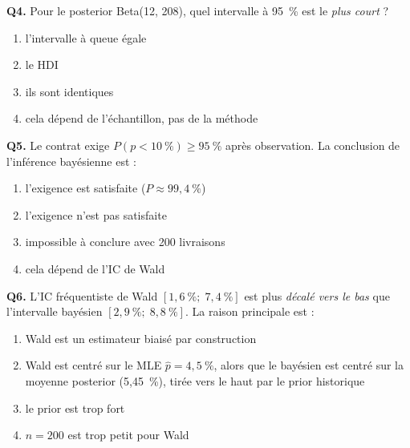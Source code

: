\documentclass[11pt,a4paper]{article}
\begin{document}
\begin{qcmbox}[Questions 4 à 6]
\textbf{Q4.} Pour le posterior Beta(12, 208), quel intervalle à 95~\% est le
\emph{plus court} ?
\begin{enumerate}[label=\Alph*.), leftmargin=8mm, itemsep=0.3mm]
  \item l'intervalle à queue égale
  \item le HDI
  \item ils sont identiques
  \item cela dépend de l'échantillon, pas de la méthode
\end{enumerate}

\vspace{2mm}
\textbf{Q5.} Le contrat exige $P(p < 10~\%) \ge 95~\%$ après observation. La
conclusion de l'inférence bayésienne est :
\begin{enumerate}[label=\Alph*.), leftmargin=8mm, itemsep=0.3mm]
  \item l'exigence est satisfaite ($P \approx 99{,}4~\%$)
  \item l'exigence n'est pas satisfaite
  \item impossible à conclure avec 200 livraisons
  \item cela dépend de l'IC de Wald
\end{enumerate}

\vspace{2mm}
\textbf{Q6.} L'IC fréquentiste de Wald $[1{,}6~\%;\; 7{,}4~\%]$ est plus
\emph{décalé vers le bas} que l'intervalle bayésien $[2{,}9~\%;\; 8{,}8~\%]$.
La raison principale est :
\begin{enumerate}[label=\Alph*.), leftmargin=8mm, itemsep=0.3mm]
  \item Wald est un estimateur biaisé par construction
  \item Wald est centré sur le MLE $\hat p = 4{,}5~\%$, alors que le bayésien
        est centré sur la moyenne posterior (5,45~\%), tirée vers le haut par
        le prior historique
  \item le prior est trop fort
  \item $n = 200$ est trop petit pour Wald
\end{enumerate}
\end{qcmbox}
\end{document}
